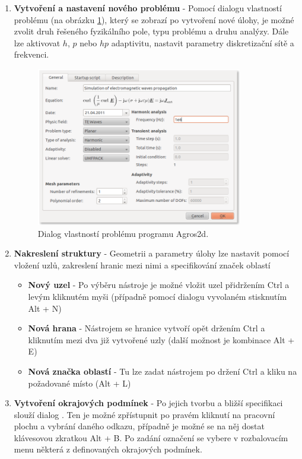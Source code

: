 \begin{enumerate}
\item {\bf Vytvoření a nastavení nového problému} - Pomocí dialogu vlastností problému (na obrázku \ref{obr:sim_problem_properties}), který se zobrazí po vytvoření nové úlohy, je možné zvolit druh řešeného fyzikálního pole, typu problému a druhu analýzy. Dále lze aktivovat $h$, $p$ nebo $hp$ adaptivitu, nastavit parametry diskretizační sítě a frekvenci.
\begin{figure}[!h]
	\centering
	\includegraphics[width=9cm]{sim_problem_properties.png}
	\caption{Dialog vlastností problému programu Agros2d.}
	\label{obr:sim_problem_properties}
\end{figure}
\item {\bf Nakreslení struktury} - Geometrii a parametry úlohy lze nastavit pomocí vložení uzlů, zakreslení hranic mezi nimi a specifikování značek oblastí
\begin{itemize}
\item {\bf Nový uzel} - Po výběru nástroje  je možné vložit uzel přidržením Ctrl a levým kliknutém myši (případně pomocí dialogu vyvolaném stisknutím Alt + N)
\item {\bf Nová hrana} - Nástrojem  se hranice vytvoří opět držením Ctrl a kliknutím mezi dva již vytvořené uzly (další možnost je kombinace Alt + E)
\item {\bf Nová značka oblastí} - Tu lze zadat nástrojem  po držení Ctrl a kliku na požadované místo (Alt + L)
\end{itemize}
\item {\bf Vytvoření okrajových podmínek} - Po jejich tvorbu a bližší specifikaci slouží dialog . Ten je možné zpřístupnit po pravém kliknutí na pracovní plochu a vybrání daného odkazu, případně je možné se na něj dostat klávesovou zkratkou Alt + B. Po zadání označení se vybere v rozbalovacím menu některá z definovaných okrajových podmínek.


\end{enumerate}
